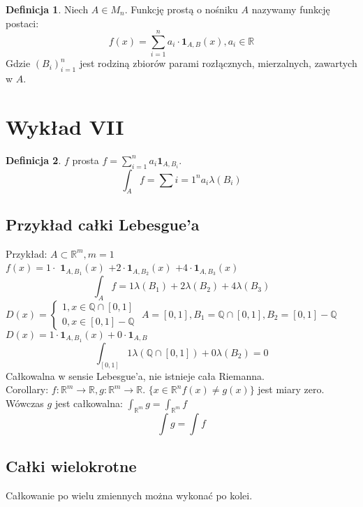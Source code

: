 \documentclass{article}
\theoremstyle{definition}
\newtheorem{de}{Definicja}[subsection]
\theoremstyle{definition}
\theoremstyle{definition}
\theoremstyle{definition}
\begin{document}
\begin{de}
    Niech $A\in M_n$. Funkcję prostą o nośniku $A$ nazywamy funkcję postaci:
    \[ f(x) = \sum_{i=1}^{n} a_i \cdot \textbf{1}_{A,B} (x), a_i\in\mathbb{R}\]
    Gdzie $(B_i)_{i=1}^{n}$ jest rodziną zbiorów parami rozłącznych, mierzalnych, zawartych w $A$.
\end{de}

\section{Wykład VII}

\begin{de}
    $f$ prosta $f=\sum_{i=1}^{n} a_i \textbf{1}_{A,B_i}$.
    \[\int_{A} f = \sum{i=1}^{n} a_i \lambda(B_i)\]
\end{de}

\subsection{Przykład całki Lebesgue'a}

Przykład:
$A\subset \mathbb{R}^m, m=1$\\
$f(x)=1 \cdot$
$\textbf{1}_{A,B_1} (x)$
$+ 2 \cdot \textbf{1}_{A,B_2} (x)$
$+ 4 \cdot \textbf{1}_{A,B_3} (x)$\\
\[\int_{A} f = 1\lambda(B_1) + 2\lambda(B_2) + 4\lambda(B_3)\]
$D(x)=\begin{cases}
    1, x\in \mathbb{Q} \cap [0,1]\\
    0, x\in [0,1] - \mathbb{Q}
\end{cases}$
$A=[0,1], B_1 = \mathbb{Q} \cap [0,1], B_2=[0,1] - \mathbb{Q}$\\
$D(x) = 1 \cdot \textbf{1}_{A,B_1} (x) + 0 \cdot \textbf{1}_{A,B}$
\[\int_{[0,1]} 1\lambda(\mathbb{Q}\cap[0,1]) + 0\lambda(B_2)=0\]
Całkowalna w sensie Lebesgue'a, nie istnieje cała Riemanna.\\
Corollary:
$f: \mathbb{R}^m \rightarrow \mathbb{R}, g: \mathbb{R}^m \rightarrow \mathbb{R}$.
$\{x\in\mathbb{R}^n f(x)\neq g(x)\}$ jest miary zero. Wówczas $g$ jest całkowalna:
$\int_{\mathbb{R}^m} g = \int_{\mathbb{R}^m} f$\\
\[\int g = \int f\]

\subsection{Całki wielokrotne}

Całkowanie po wielu zmiennych można wykonać po kolei.
\end{document}
